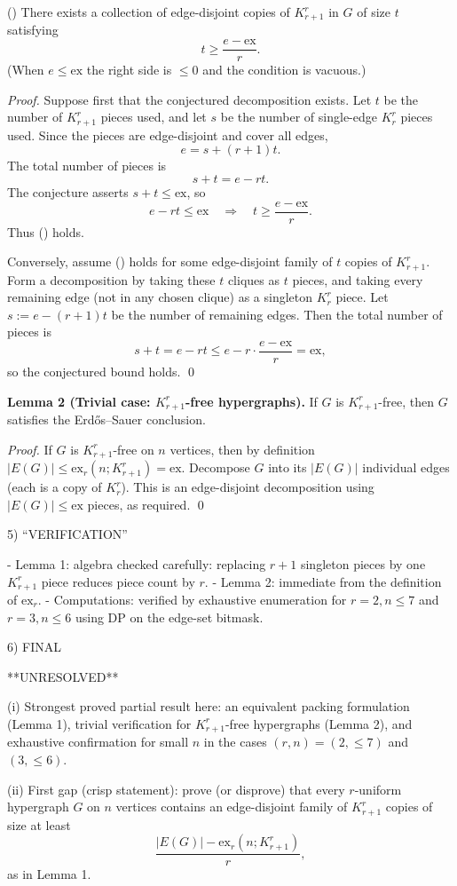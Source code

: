 (\*) There exists a collection of edge-disjoint copies of $K_{r+1}^r$ in $G$ of size $t$ satisfying
\[
 t \ge \frac{e-\mathrm{ex}}{r}.
\]
(When $e\le \mathrm{ex}$ the right side is $\le 0$ and the condition is vacuous.)

\emph{Proof.}
Suppose first that the conjectured decomposition exists. Let $t$ be the number of $K_{r+1}^r$ pieces used, and let $s$ be the number of single-edge $K_r^r$ pieces used. Since the pieces are edge-disjoint and cover all edges,
\[
 e = s + (r+1)t.
\]
The total number of pieces is
\[
 s+t = e - r t.
\]
The conjecture asserts $s+t\le \mathrm{ex}$, so
\[
 e - r t \le \mathrm{ex}\quad\Longrightarrow\quad t\ge \frac{e-\mathrm{ex}}{r}.
\]
Thus (\*) holds.

Conversely, assume (\*) holds for some edge-disjoint family of $t$ copies of $K_{r+1}^r$.
Form a decomposition by taking these $t$ cliques as $t$ pieces, and taking every remaining edge (not in any chosen clique) as a singleton $K_r^r$ piece. Let $s:=e-(r+1)t$ be the number of remaining edges. Then the total number of pieces is
\[
 s+t = e - r t \le e - r\cdot\frac{e-\mathrm{ex}}{r}=\mathrm{ex},
\]
so the conjectured bound holds.
\qed

\medskip
\textbf{Lemma 2 (Trivial case: $K_{r+1}^r$-free hypergraphs).}
If $G$ is $K_{r+1}^r$-free, then $G$ satisfies the Erd\H{o}s--Sauer conclusion.

\emph{Proof.}
If $G$ is $K_{r+1}^r$-free on $n$ vertices, then by definition $|E(G)|\le \mathrm{ex}_r(n;K_{r+1}^r)=\mathrm{ex}$.
Decompose $G$ into its $|E(G)|$ individual edges (each is a copy of $K_r^r$). This is an edge-disjoint decomposition using $|E(G)|\le \mathrm{ex}$ pieces, as required.
\qed

5) “VERIFICATION”

- Lemma 1: algebra checked carefully: replacing $r+1$ singleton pieces by one $K_{r+1}^r$ piece reduces piece count by $r$.
- Lemma 2: immediate from the definition of $\mathrm{ex}_r$.
- Computations: verified by exhaustive enumeration for $r=2,n\le 7$ and $r=3,n\le 6$ using DP on the edge-set bitmask.

6) FINAL

**UNRESOLVED**

(i) Strongest proved partial result here: an equivalent packing formulation (Lemma 1), trivial verification for $K_{r+1}^r$-free hypergraphs (Lemma 2), and exhaustive confirmation for small $n$ in the cases $(r,n)=(2,\le 7)$ and $(3,\le 6)$.

(ii) First gap (crisp statement): prove (or disprove) that every $r$-uniform hypergraph $G$ on $n$ vertices contains an edge-disjoint family of $K_{r+1}^r$ copies of size at least
\[
\frac{|E(G)|-\mathrm{ex}_r(n;K_{r+1}^r)}{r},
\]
as in Lemma 1.

